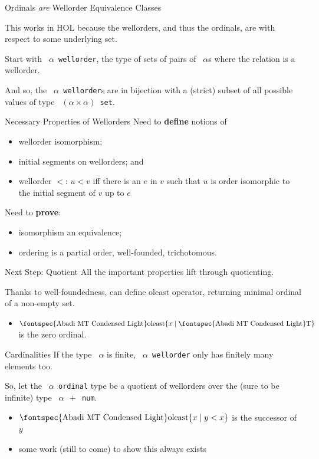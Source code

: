 \documentclass[xetex,14pt]{beamer}
\newcommand{\const}[1]{\mbox{\fontspec{Abadi MT Condensed Light}#1}}
\newcommand{\ty}[1]{\texttt{\color{MyPurple} #1}}
\begin{document}
\begin{frame}{Ordinals \emph{are} Wellorder Equivalence Classes}

This works in HOL because the wellorders, and thus the ordinals, are with respect to some underlying set.

\bigskip
Start with \ty{$\alpha$ wellorder}, the type of sets of pairs of \ty{$\alpha$}s where the relation is a wellorder.

\bigskip
And so, the \ty{$\alpha$ wellorder}s are in bijection with a (strict) subset of all possible values of type \ty{$(\alpha \times \alpha)$~set}.
\end{frame}

\begin{frame}{Necessary Properties of Wellorders}
Need to \textbf{define} notions of
\begin{itemize}
\item wellorder isomorphism;
\item initial segments on wellorders; and
\item wellorder $<$:  $u < v$ iff there is an $e$ in $v$ such that $u$ is order isomorphic to the initial segment of $v$ up to $e$
\end{itemize}

\bigskip
Need to \textbf{prove}:
\begin{itemize}
\item isomorphism an equivalence;
\item ordering is a partial order, well-founded, trichotomous.
\end{itemize}
\end{frame}

\begin{frame}{Next Step: Quotient}
All the important properties lift through quotienting.

\bigskip
Thanks to well-foundedness, can define \const{oleast} operator, returning minimal ordinal of a non-empty set.
\begin{itemize}
\item $\const{oleast}\{x\mid\const{T}\}$ is the zero ordinal.
\end{itemize}
\end{frame}

\newcommand{\ainf}{\ty{$\alpha\;\,+$~num}}
\begin{frame}{Cardinalities}
If the type \ty{$\alpha$} is finite, \ty{$\alpha$~wellorder} only has finitely many elements too.

\bigskip
So, let the \ty{$\alpha$~ordinal} type be a quotient of wellorders over the (sure to be infinite) type \ainf.
\begin{itemize}
\item $\const{oleast}\{ x \mid y < x \}$ is the successor of $y$
\item some work (still to come) to show this always exists
\end{itemize}

\end{frame}
\end{document}
